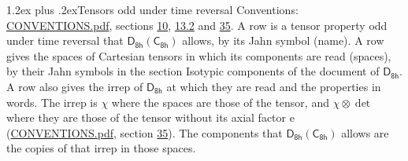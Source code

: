 \documentclass[10pt,a4paper]{article}
\makeatletter
\renewcommand\section{\@startsection{section}{1}{\z@}{-3ex plus -1ex minus -.2ex}%
  {1.2ex plus .2ex}{\normalfont\large\sffamily\bfseries\color{parttitle}}}
\numberwithin{equation}{section}
\newcommand{\grp}[1]{\mathsf{#1}}
\newcommand{\irrprod}{\otimes}
\makeatother
\begin{document}
\section{Tensors odd under time reversal}\label{s:time_odd}
Conventions: \href{../../CONVENTIONS.pdf}{CONVENTIONS.pdf}, sections \href{../../../rotation/CONVENTIONS.pdf\#conv.10}{10}, \href{../../../rotation/CONVENTIONS.pdf\#conv.13.2}{13.2} and \href{../../CONVENTIONS.pdf\#conv.35}{35}.
\leavevmode\label{n:head.name.property}A row is a tensor property odd under time reversal that $\grp{D_{8h}}(\grp{C_{8h}})$ allows, by its Jahn symbol (name). \label{n:head.spaces}A row gives the spaces of Cartesian tensors in which its components are read (spaces), by their Jahn symbols in the section Isotypic components of the document of \href{../../../rotation/data/pdf/D8h.pdf}{$\grp{D_{8h}}$}. \label{n:head.properties}A row also gives the irrep of $\grp{D_{8h}}$ at which they are read and the properties in words. The irrep is $\chi$ where the spaces are those of the tensor, and $\chi \irrprod \det$ where they are those of the tensor without its axial factor e (\href{../../CONVENTIONS.pdf}{CONVENTIONS.pdf}, section \href{../../CONVENTIONS.pdf\#conv.35}{35}). The components that $\grp{D_{8h}}(\grp{C_{8h}})$ allows are the copies of that irrep in those spaces.
\end{document}
